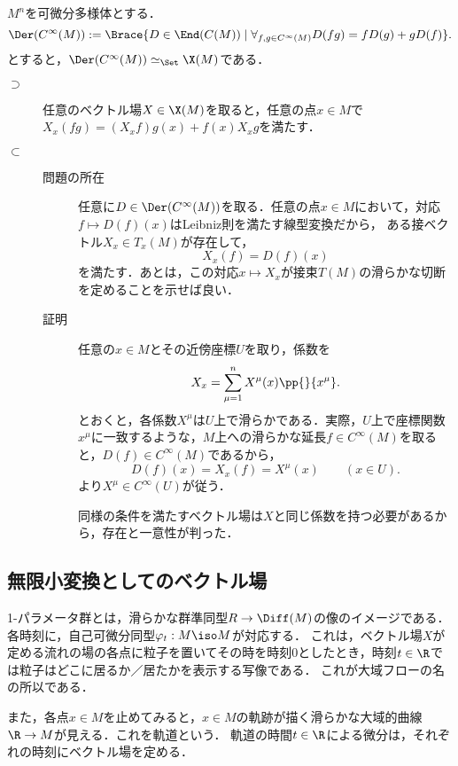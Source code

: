 \documentclass[uplatex,dvipdfmx]{jsreport}
\begin{document}
\begin{theorem}[ベクトル場の導分としての特徴付け]
    $M^n$を可微分多様体とする．
    \[\Der(C^\infty(M)):=\Brace{D\in\End(C(M))\mid\forall_{f,g\in C^\infty(M)} D(fg)=fD(g)+gD(f)}.\]
    とすると，$\Der(C^\infty(M))\simeq_\Set\X(M)$である．
\end{theorem}
\begin{Proof}\mbox{}
    \begin{description}
        \item[$\supset$] 任意のベクトル場$X\in\X(M)$を取ると，任意の点$x\in M$で$X_x(fg)=(X_xf)g(x)+f(x)X_xg$を満たす．
        \item[$\subset$] 
        \begin{description}
            \item[問題の所在] 任意に$D\in\Der(C^\infty(M))$を取る．任意の点$x\in M$において，対応$f\mapsto D(f)(x)$はLeibniz則を満たす線型変換だから，
            ある接ベクトル$X_x\in T_x(M)$が存在して，
            \[X_x(f)=D(f)(x)\]
            を満たす．あとは，この対応$x\mapsto X_x$が接束$T(M)$の滑らかな切断を定めることを示せば良い．
            \item[証明] 任意の$x\in M$とその近傍座標$U$を取り，係数を
            \[X_x=\sum_{\mu=1}^nX^\mu(x)\pp{}{x^\mu}.\]
            とおくと，各係数$X^\mu$は$U$上で滑らかである．実際，$U$上で座標関数$x^\mu$に一致するような，$M$上への滑らかな延長$f\in C^\infty(M)$を取ると，$D(f)\in C^\infty(M)$であるから，
            \[D(f)(x)=X_x(f)=X^\mu(x)\qquad(x\in U).\]
            より$X^\mu\in C^\infty(U)$が従う．

            同様の条件を満たすベクトル場は$X$と同じ係数を持つ必要があるから，存在と一意性が判った．
        \end{description}
    \end{description}
\end{Proof}

\subsection{無限小変換としてのベクトル場}

\begin{tcolorbox}[colframe=ForestGreen, colback=ForestGreen!10!white,breakable,colbacktitle=ForestGreen!40!white,coltitle=black,fonttitle=\bfseries\sffamily,
title=ベクトル場を通じて多様体の形を考えたい]
    1-パラメータ群とは，滑らかな群準同型$R\to\Diff(M)$の像のイメージである．各時刻に，自己可微分同型$\varphi_t:M\iso M$が対応する．
    これは，ベクトル場$X$が定める流れの場の各点に粒子を置いてその時を時刻$0$としたとき，時刻$t\in\R$では粒子はどこに居るか／居たかを表示する写像である．
    これが大域フローの名の所以である．

    また，各点$x\in M$を止めてみると，$x\in M$の軌跡が描く滑らかな大域的曲線$\R\to M$が見える．これを軌道という．
    軌道の時間$t\in\R$による微分は，それぞれの時刻にベクトル場を定める．
\end{tcolorbox}
\end{document}
